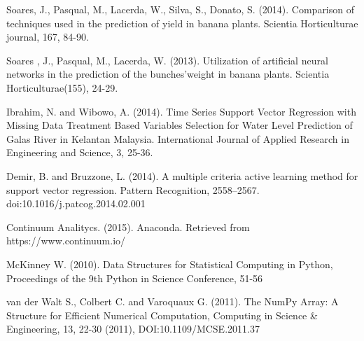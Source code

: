 \documentclass[review]{elsarticle}
\begin{document}
\begin{thebibliography}{1}
 Soares, J., Pasqual, M., Lacerda, W., Silva, S., Donato, S. (2014). Comparison of techniques used in the prediction of yield in banana plants. Scientia Horticulturae journal, 167, 84-90.

 Soares , J., Pasqual, M., Lacerda, W. (2013). Utilization of artificial neural networks in the prediction of the bunches’weight in banana plants. Scientia Horticulturae(155), 24-29.

  Ibrahim, N. and Wibowo, A. (2014). Time Series Support Vector Regression with Missing Data Treatment Based Variables Selection for Water Level Prediction of Galas River in Kelantan Malaysia. International Journal of Applied Research in Engineering and Science, 3, 25-36.

 Demir, B. and Bruzzone, L. (2014). A multiple criteria active learning method for support vector regression. Pattern Recognition, 2558–2567. doi:10.1016/j.patcog.2014.02.001

 Continuum Analitycs. (2015). Anaconda. Retrieved from https://www.continuum.io/

 McKinney W. (2010). Data Structures for Statistical Computing in Python, Proceedings of the 9th Python in Science Conference, 51-56 

 van der Walt S., Colbert C. and Varoquaux G. (2011). The NumPy Array: A Structure for Efficient Numerical Computation, Computing in Science \& Engineering, 13, 22-30 (2011), DOI:10.1109/MCSE.2011.37 


\end{thebibliography}
\end{document}
